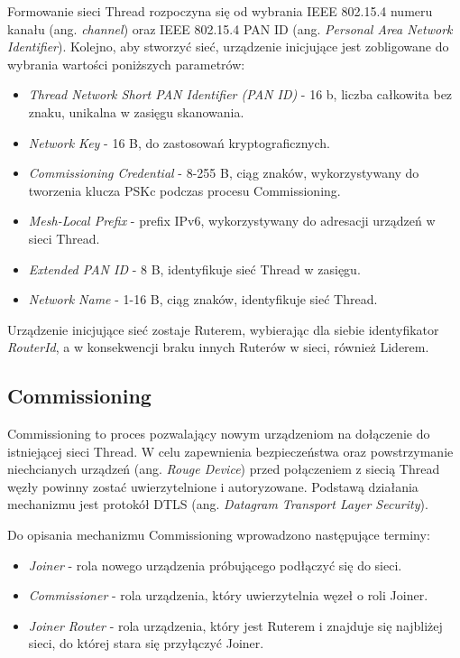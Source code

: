     Formowanie sieci Thread rozpoczyna się od wybrania IEEE 802.15.4 numeru kanału (ang. \textit{channel}) oraz IEEE 802.15.4 PAN ID (ang. \textit{Personal Area Network Identifier}). Kolejno, aby stworzyć sieć, urządzenie inicjujące jest zobligowane do wybrania wartości poniższych parametrów:
    \begin{itemize}
        \item \textit{Thread Network Short PAN Identifier (PAN ID)} - 16 b, liczba całkowita bez znaku, unikalna w zasięgu skanowania.
        \item \textit{Network Key} - 16 B, do zastosowań kryptograficznych.
        \item \textit{Commissioning Credential} - 8-255 B, ciąg znaków, wykorzystywany do tworzenia klucza PSKc podczas procesu Commissioning.
        \item \textit{Mesh-Local Prefix} - prefix IPv6, wykorzystywany do adresacji urządzeń w sieci Thread.
        \item \textit{Extended PAN ID} - 8 B, identyfikuje sieć Thread w zasięgu.
        \item \textit{Network Name} - 1-16 B, ciąg znaków, identyfikuje sieć Thread.
    \end{itemize}{}

    Urządzenie inicjujące sieć zostaje Ruterem, wybierając dla siebie identyfikator \textit{RouterId}, a w konsekwencji braku innych Ruterów w sieci, również Liderem.

    \subsection{Commissioning}
    \label{subsec:commissioning}

    Commissioning to proces pozwalający nowym urządzeniom na dołączenie do istniejącej sieci Thread. W celu zapewnienia bezpieczeństwa oraz powstrzymanie niechcianych urządzeń (ang. \textit{Rouge Device}) przed połączeniem z siecią Thread węzły powinny zostać uwierzytelnione i autoryzowane. Podstawą działania mechanizmu jest protokół DTLS (ang. \textit{Datagram Transport Layer Security}).

    Do opisania mechanizmu Commissioning wprowadzono następujące terminy:
    \begin{itemize}
        \item \textit{Joiner} - rola nowego urządzenia próbującego podłączyć się do sieci.
        \item \textit{Commissioner} - rola urządzenia, który uwierzytelnia węzeł o roli Joiner.
        \item \textit{Joiner Router} - rola urządzenia, który jest Ruterem i znajduje się najbliżej sieci, do której stara się przyłączyć Joiner.
    \end{itemize}

